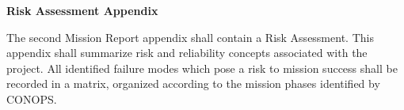 \textbf{\hfill\break
}

\textbf{Risk Assessment Appendix}

The second Mission Report appendix shall contain a Risk Assessment. This
appendix shall summarize risk and reliability concepts associated with
the project. All identified failure modes which pose a risk to mission
success shall be recorded in a matrix, organized according to the
mission phases identified by CONOPS.
